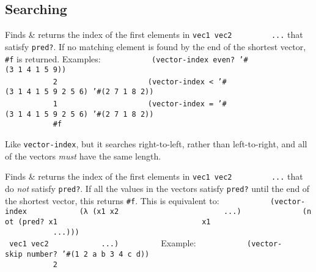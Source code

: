 \subsection{Searching}

\begin{entry}{%
  }

  Finds \& returns the index of
  the first elements in \texttt{vec1~vec2~~~~~~~~~...} that satisfy
  \texttt{pred?}. If no matching element is found by the end of the
  shortest vector, \texttt{\#f} is returned.  Examples:
  \texttt{~~~~~~~~~~~(vector-index~even?~'\#(3~1~4~1~5~9))~~~~~~~~~}\\
  \texttt{~~~~~~~~~~~2~~~~~~~~~}
  \texttt{~~~~~~~~~~~(vector-index~\textless{}~'\#(3~1~4~1~5~9~2~5~6)~'\#(2~7~1~8~2))~~~~~~~~~}\\
  \texttt{~~~~~~~~~~~1~~~~~~~~~}
  \texttt{~~~~~~~~~~~(vector-index~=~'\#(3~1~4~1~5~9~2~5~6)~'\#(2~7~1~8~2))~~~~~~~~~}\\
  \texttt{~~~~~~~~~~~\#f~~~~~~~~~}
\end{entry}

\begin{entry}{%
  }

  Like
  \texttt{vector-index}, but it searches right-to-left, rather than
  left-to-right, and all of the vectors \emph{must} have the same
  length.
\end{entry}

\begin{entry}{%
  }

  Finds \& returns the index of
  the first elements in \texttt{vec1~vec2~~~~~~~~~...} that do
  \emph{not} satisfy \texttt{pred?}. If all the values in the vectors
  satisfy \texttt{pred?}  until the end of the shortest vector, this
  returns \texttt{\#f}. This is equivalent to:
  \texttt{~~~~~~~~~~~(vector-index~~~~~~~~~~~~(λ~(x1~x2~~~~~~~~~~~~~~~~~~~~~~~~...)~~~~~~~~~~~~~~(not~(pred?~x1~~~~~~~~~~~~~~~~~~~~~~~~~~~~~~~~~x1~~~~~~~~~~~~~~~~~~~~~~~~~~~~~~~~~~...)))~~~~~~~~~~~~~~~~~~~~~~~~~~~~~~~~~~~~~~~~~~~~~~~~~~~~~~vec1~vec2~~~~~~~~~~~~...)~~~~~~~~~}
  Example:
  \texttt{~~~~~~~~~~~(vector-skip~number? '\#(1~2~a~b~3~4~c~d))~~~~~~~~~}\\
  \texttt{~~~~~~~~~~~2~~~~~~~~~}
\end{entry}

